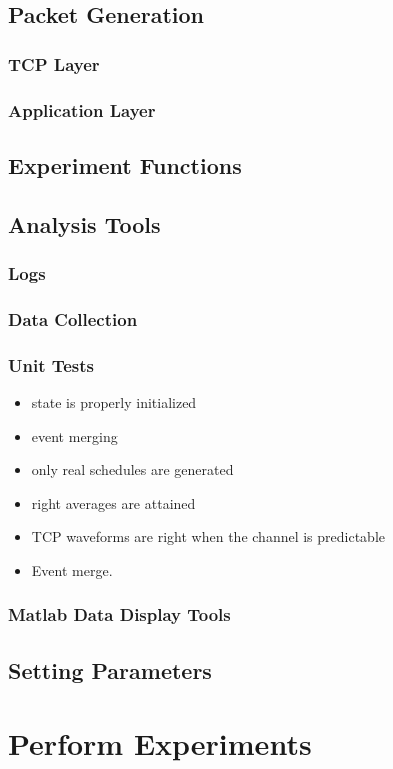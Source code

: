 \documentclass{IEEEtran}%
\begin{document}
\subsection{Packet Generation}
\subsubsection{TCP Layer}
\subsubsection{Application Layer}
\subsection{Experiment Functions}
\subsection{Analysis Tools}
\subsubsection{Logs}
\subsubsection{Data Collection}
\subsubsection{Unit Tests}
\begin{itemize}
\item state is properly initialized
\item event merging
\item only real schedules are generated
\item right averages are attained
\item TCP waveforms are right when the channel is predictable
\item Event merge.
\end{itemize}
\subsubsection{Matlab Data Display Tools}
\subsection{Setting Parameters}


\section{Perform Experiments}
\end{document}
